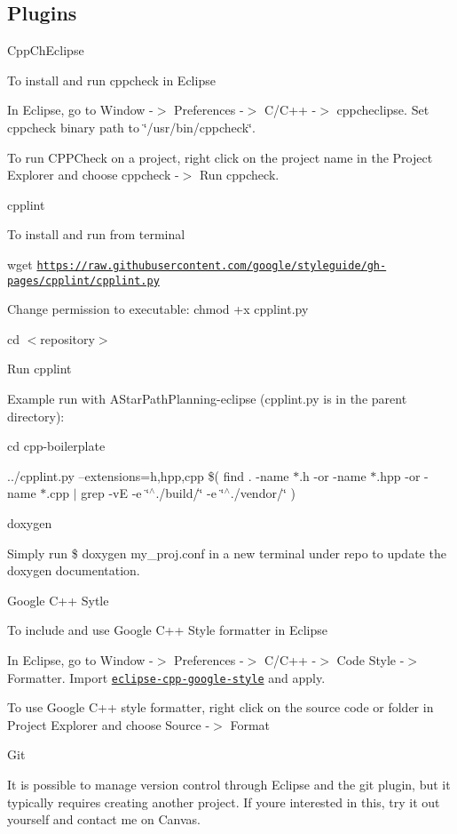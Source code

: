 \subsection*{Plugins}


\begin{DoxyItemize}
\item Cpp\+Ch\+Eclipse

To install and run cppcheck in Eclipse
\begin{DoxyEnumerate}
\item In Eclipse, go to Window -\/$>$ Preferences -\/$>$ C/\+C++ -\/$>$ cppcheclipse. Set cppcheck binary path to \char`\"{}/usr/bin/cppcheck\char`\"{}.
\item To run C\+P\+P\+Check on a project, right click on the project name in the Project Explorer and choose cppcheck -\/$>$ Run cppcheck.
\end{DoxyEnumerate}
\item cpplint

To install and run from terminal
\begin{DoxyEnumerate}
\item wget \href{https://raw.githubusercontent.com/google/styleguide/gh-pages/cpplint/cpplint.py}{\tt https\+://raw.\+githubusercontent.\+com/google/styleguide/gh-\/pages/cpplint/cpplint.\+py}
\item Change permission to executable\+: chmod +x cpplint.\+py
\item cd $<$repository$>$
\item Run cpplint
\end{DoxyEnumerate}

Example run with A\+Star\+Path\+Planning-\/eclipse (cpplint.\+py is in the parent directory)\+:

cd cpp-\/boilerplate

../cpplint.py --extensions=h,hpp,cpp \$( find . -\/name $\ast$.h -\/or -\/name $\ast$.hpp -\/or -\/name $\ast$.cpp $\vert$ grep -\/vE -\/e \char`\"{}$^\wedge$./build/\char`\"{} -\/e \char`\"{}$^\wedge$./vendor/\char`\"{} )
\item doxygen

Simply run \$ doxygen my\+\_\+proj.\+conf in a new terminal under repo to update the doxygen documentation.
\item Google C++ Sytle

To include and use Google C++ Style formatter in Eclipse
\begin{DoxyEnumerate}
\item In Eclipse, go to Window -\/$>$ Preferences -\/$>$ C/\+C++ -\/$>$ Code Style -\/$>$ Formatter. Import \href{https://raw.githubusercontent.com/google/styleguide/gh-pages/eclipse-cpp-google-style.xml}{\tt eclipse-\/cpp-\/google-\/style} and apply.
\item To use Google C++ style formatter, right click on the source code or folder in Project Explorer and choose Source -\/$>$ Format
\end{DoxyEnumerate}
\item Git

It is possible to manage version control through Eclipse and the git plugin, but it typically requires creating another project. If you\textquotesingle{}re interested in this, try it out yourself and contact me on Canvas. 
\end{DoxyItemize}
